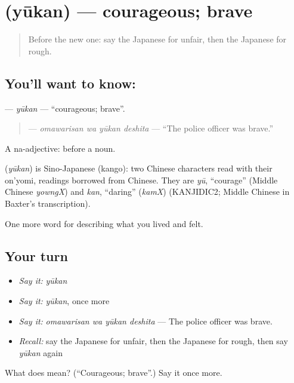 \section[\texorpdfstring{\ja{ゆうかん} (yūkan)}{ゆうかん (yūkan)}]{ (yūkan) — courageous; brave}

\label{lesson:JA-C439-yuukan}



\begin{quote}
Before the new one: say the Japanese for unfair, then the Japanese for rough.
\end{quote}

\subsection*{You'll want to know: }
\textbf{} — \emph{yūkan} — \textquotedblleft{}courageous; brave\textquotedblright{}.

\begin{quote}
\textbf{ } — \emph{omawarisan wa yūkan deshita} — \textquotedblleft{}The police officer was brave.\textquotedblright{}
\end{quote}

A na-adjective:  before a noun.

\begin{cousinweb}
\textbf{} (\emph{yūkan}) is Sino-Japanese (kango): two Chinese characters read with their on'yomi, readings borrowed from Chinese. They are \emph{yū}, \textquotedblleft{}courage\textquotedblright{} (Middle Chinese \emph{yowngX}) and \emph{kan}, \textquotedblleft{}daring\textquotedblright{} (\emph{kamX}) (KANJIDIC2; Middle Chinese in Baxter's transcription).
\end{cousinweb}

\begin{grammarlens}[title={What you've built}]
One more word for describing what you lived and felt.
\end{grammarlens}

\subsection*{Your turn}
\begin{itemize}
\raggedright
  \item \emph{Say it:} \emph{yūkan}
  \item \emph{Say it:} \emph{yūkan}, once more
  \item \emph{Say it:} \emph{omawarisan wa yūkan deshita} — The police officer was brave.
  \item \emph{Recall:} say the Japanese for unfair, then the Japanese for rough, then say \emph{yūkan} again
\end{itemize}

\begin{tcolorbox}[breakable,colback=teal!4,colframe=teal!35!black,title={Before you move on}]
What does  mean? (\textquotedblleft{}Courageous; brave\textquotedblright{}.) Say it once more.
\end{tcolorbox}
